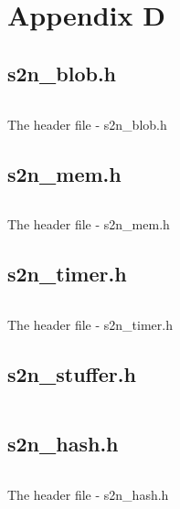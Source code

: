 \chapter{Appendix D} \label{app:s2nHeader}

\section{s2n\_blob.h}\label{appsec:s2nBlob}
\begin{listing}[ht]
\inputminted[frame=single, breaklines, linenos, numbersep=5pt, tabsize=4, firstline=20, fontsize=\footnotesize]{c}{./contents/code/headers/s2n_blob.h} %
\caption{The header file - s2n\_blob.h}
\end{listing}

\section{s2n\_mem.h}\label{appsec:s2nMem}
\begin{listing}[ht]
\inputminted[frame=single, breaklines, linenos, numbersep=5pt, tabsize=4, firstline=22, fontsize=\footnotesize]{c}{./contents/code/headers/s2n_mem.h} %
\caption{The header file - s2n\_mem.h}
\end{listing}

\section{s2n\_timer.h}\label{appsec:s2nTimer}
\begin{listing}[ht]
\inputminted[frame=single, breaklines, linenos, numbersep=5pt, tabsize=4, firstline=20, fontsize=\footnotesize]{c}{./contents/code/headers/s2n_timer.h} %
\caption{The header file - s2n\_timer.h}
\end{listing}

\section{s2n\_stuffer.h}\label{appsec:s2nStuffer}
\inputminted[frame=single, breaklines, linenos, numbersep=5pt, tabsize=4, firstline=23, fontsize=\footnotesize]{c}{./contents/code/headers/s2n_stuffer.h} %

\section{s2n\_hash.h}\label{appsec:s2nHash}
\begin{listing}[ht]
\inputminted[frame=single, breaklines, linenos, numbersep=5pt, tabsize=4, firstline=40, fontsize=\footnotesize]{c}{./contents/code/headers/s2n_hash.h} %
\caption{The header file - s2n\_hash.h}
\end{listing}

